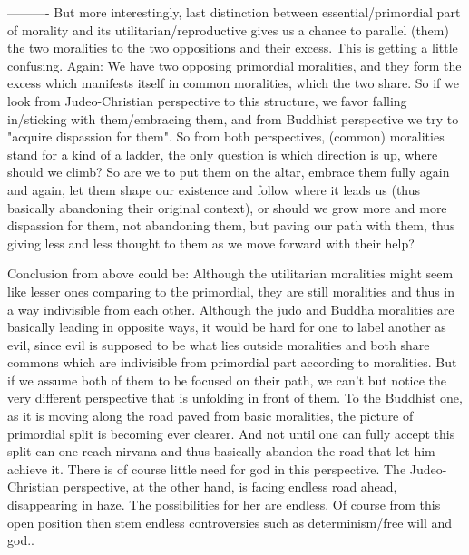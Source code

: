 \documentclass[10pt]{book}
\begin{document}
----------
But more interestingly, last distinction between essential/primordial part of morality and its utilitarian/reproductive gives us a chance to parallel (them) the two moralities to the two oppositions and their excess. This is getting a little confusing. Again: We have two opposing primordial moralities, and they form the excess which manifests itself in common moralities, which the two share. So if we look from Judeo-Christian perspective to this structure, we favor falling in/sticking with them/embracing them, and from Buddhist perspective we try to "acquire dispassion for them". So from both perspectives, (common) moralities stand for a kind of a ladder, the only question is which direction is up, where should we climb? So are we to put them on the altar, embrace them fully again and again, let them shape our existence and follow where it leads us (thus basically abandoning their original context), or should we grow more and more dispassion for them, not abandoning them, but paving our path with them, thus giving less and less thought to them as we move forward with their help?   

Conclusion from above could be: Although the utilitarian moralities might seem like lesser ones comparing to the primordial, they are still moralities and thus in a way indivisible from each other. Although the judo and Buddha moralities are basically leading in opposite ways, it would be hard for one to label another as evil, since evil is supposed to be what lies outside moralities and both share commons which are indivisible from primordial part according to moralities. 
But if we assume both of them to be focused on their path, we can't but notice the very different perspective that is unfolding in front of them. To the Buddhist one, as it is moving along the road paved from basic moralities, the picture of primordial split is becoming ever clearer. And not until one can fully accept this split can one reach nirvana and thus basically abandon the road that let him achieve it. There is of course little need for god in this perspective.
The Judeo-Christian perspective, at the other hand, is facing endless road ahead, disappearing in haze. The possibilities for her are endless. Of course from this open position then stem endless controversies such as determinism/free will and god..  
\end{document}
